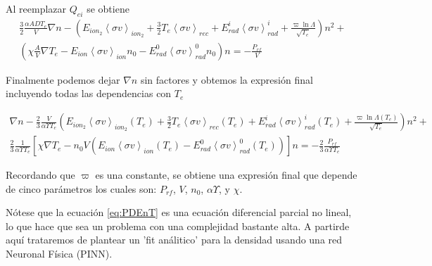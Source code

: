   Al reemplazar $Q_{ei}$ se obtiene
  \begin{eqnarray*}
    \frac{3}{2}\frac{\alpha AD T_e}{V}\nabla n - \left(E_{ion_2}\left<\sigma v\right>_{ion_2} + \frac{3}{2}T_e\left<\sigma v\right>_{rec} + E_{rad}^i\left<\sigma v\right>_{rad}^i + \frac{\varpi \ln{\Lambda}}{\sqrt{T_e}}\right)n^2 + \\ \left(\chi\frac{A}{V}\nabla T_e - E_{ion}\left<\sigma v\right>_{ion}n_0 - E_{rad}^0\left<\sigma v\right>_{rad}^0n_0\right)n = - \frac{P_{rf}}{V}
  \end{eqnarray*}

  Finalmente podemos dejar $\nabla n$ sin factores y obtemos la expresi\'on final incluyendo todas las dependencias con $T_e$

  \begin{eqnarray}\label{eq:PDEnT}
    \nabla n - \frac{2}{3}\frac{V}{\alpha \varUpsilon T_e}\left(E_{ion_2}\left<\sigma v\right>_{ion_2}(T_e) + \frac{3}{2}T_e\left<\sigma v\right>_{rec}(T_e) + E_{rad}^i\left<\sigma v\right>_{rad}^i(T_e) + \frac{\varpi\ln{\Lambda}(T_e)}{\sqrt{T_e}}\right)n^2 + \nonumber\\ \frac{2}{3}\frac{1}{\alpha\varUpsilon T_e}\left[\chi\nabla T_e - n_0V\left(E_{ion}\left<\sigma v\right>_{ion}(T_e) - E_{rad}^0\left<\sigma v\right>_{rad}^0(T_e)\right)\right]n = -\frac{2}{3}\frac{P_{rf}}{\alpha \varUpsilon T_e}
  \end{eqnarray}

  Recordando que $\varpi$ es una constante, se obtiene una expresi\'on final que depende de cinco par\'ametros los cuales son: $P_{rf}$, $V$, $n_0$, $\alpha\varUpsilon$, y $\chi$. 

  N\'otese que la ecuaci\'on \eqref{eq:PDEnT} es una ecuaci\'on diferencial parcial no lineal, lo que hace que sea un problema con una complejidad bastante alta. A partirde aqu\'i trataremos de plantear un 'fit an\'alitico' para la densidad usando una red Neuronal F\'isica (PINN). 
